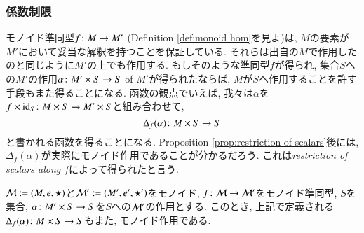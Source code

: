 
\subsubsection{係数制限}


モノイド準同型$f\colon M\rightarrow M'$ (Definition \ref{def:monoid hom}を見よ)は, $M$の要素が$M'$において妥当な解釈を持つことを保証している. それらは出自の$M$で作用したのと同じように$M'$の上でも作用する. もしそのような準同型$f$が得られ, 集合$S$への$M'$の作用$\alpha\colon M'\times S\rightarrow S$ of $M'$が得られたならば, $M$が$S$へ作用することを許す手段もまた得ることになる. 函数の観点でいえば, 我々は$\alpha$を$f\times\id_S\taking M\times S\to M'\times S$と組み合わせて, $$\Delta_f(\alpha)\colon M\times S\rightarrow S$$と書かれる函数を得ることになる. Proposition \ref{prop:restriction of scalars}後には, $\Delta_f(\alpha)$が実際にモノイド作用であることが分かるだろう. これは\emph{restriction of scalars along $f$}によって得られたと言う.

\begin{proposition}\label{prop:restriction of scalars}


$\mathcal{M}:=(M,e,\star)$と$\mathcal{M}':=(M',e',\star')$をモノイド, $f\colon\mathcal{M}\rightarrow\mathcal{M}'$をモノイド準同型, $S$を集合, $\alpha\colon M'\times S\rightarrow S$を$S$への$\mathcal{M}'$の作用とする. このとき, 上記で定義される$\Delta_f(\alpha)\colon M\times S\rightarrow S$もまた, モノイド作用である.

\end{proposition}


